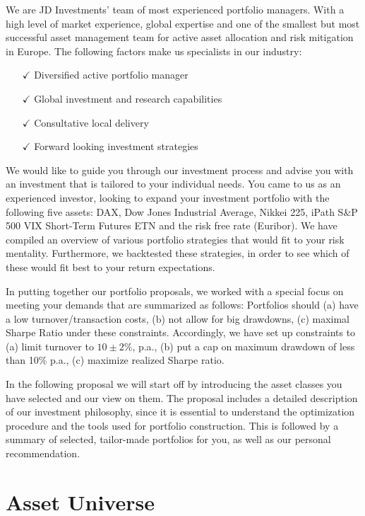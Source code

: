 \documentclass[11pt, parskip=full, DIV=14, headings=small, footsepline, footinclude=false, headsepline]{scrreprt}
\begin{document}
We are JD Investments’ team of most experienced portfolio managers.
With a high level of market experience, global expertise and one of the smallest but most successful asset management team for active asset allocation and risk mitigation in Europe.
The following factors make us specialists in our industry: 

\begin{itemize}
\item[$\checkmark$] Diversified active portfolio manager
\item[$\checkmark$] Global investment and research capabilities 
\item[$\checkmark$] Consultative local delivery 
\item[$\checkmark$] Forward looking investment strategies 
\end{itemize}

We would like to guide you through our investment process and advise you with an investment that is tailored to your individual needs.
You came to us as an experienced investor, looking to expand your investment portfolio with the following five assets: DAX, Dow Jones Industrial Average, Nikkei 225, iPath S\&P 500 VIX Short-Term Futures ETN and the risk free rate (Euribor).
We have compiled an overview of various portfolio strategies that would fit to your risk mentality.
Furthermore, we backtested these strategies, in order to see which of these would fit best to your return expectations.
  
In putting together our portfolio proposals, we worked with a special focus on meeting your demands that are summarized as follows:
Portfolios should (a) have a low turnover/transaction costs, (b) not allow for big drawdowns, (c) maximal Sharpe Ratio under these constraints.
Accordingly, we have set up constraints to (a) limit turnover to $10 \pm 2\%$, p.a., (b) put a cap on maximum drawdown of less than 10\% p.a., (c) maximize realized Sharpe ratio.

In the following proposal we will start off by introducing the asset classes you have selected and our view on them.
The proposal includes a detailed description of our investment philosophy, since it is essential to understand the optimization procedure and the tools used for portfolio construction.
This is followed by a summary of selected, tailor-made portfolios for you, as well as our personal recommendation.


\chapter{Asset Universe}
\end{document}
